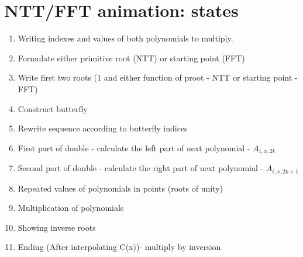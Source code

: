 \documentclass[12pt]{article}
\begin{document}
\section{NTT/FFT animation: states}
\begin {enumerate}
	\item Writing indexes and values of both polynomials to multiply.
	\item Formulate either primitive root (NTT) or starting point (FFT)
	\item Write first two roots (1 and either function of proot - NTT or starting point - FFT)
	\item Construct butterfly
	\item Rewrite sequence according to butterfly indices
	\item First part of double - calculate the left part of next polynomial - \(A_{i,x,2k}\)
	\item Second part of double - calculate the right part of next polynomial - \(A_{i,x,2k+1}\)
	\item Repeated values of polynomials in points (roots of unity)
	\item Multiplication of polynomials
	\item Showing inverse roots
	\item Ending (After interpolating C(x))- multiply by inversion
\end {enumerate}
\end{document}
